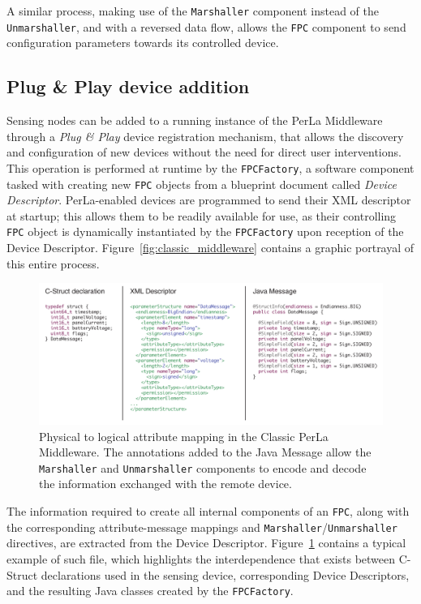 A similar process, making use of the \texttt{Marshaller} component instead of
the \texttt{Unmarshaller}, and with a reversed data flow, allows the
\texttt{FPC} component to send configuration parameters towards its controlled
device.

\subsection{Plug \& Play device addition}
\label{sec:classic_fpcfactory}

Sensing nodes can be added to a running instance of the PerLa Middleware
through a \textit{Plug \& Play} device registration mechanism, that allows the
discovery and configuration of new devices without the need for direct user
interventions. This operation is performed at runtime by the
\texttt{FPCFactory}, a software component tasked with creating new \texttt{FPC}
objects from a blueprint document called \textit{Device Descriptor}.
PerLa-enabled devices are programmed to send their XML descriptor at startup;
this allows them to be readily available for use, as their controlling
\texttt{FPC} object is dynamically instantiated by the \texttt{FPCFactory} upon
reception of the Device Descriptor. Figure~\ref{fig:classic_middleware}
contains a graphic portrayal of this entire process.

\begin{figure}[h!]
\includegraphics[width=\textwidth]{imgs/classic_descriptor.pdf}
\caption{Physical to logical attribute mapping in the Classic PerLa Middleware.
The annotations added to the Java Message allow the \texttt{Marshaller} and
\texttt{Unmarshaller} components to encode and decode the information exchanged 
with the remote device.}
\label{fig:classic_descriptor}
\end{figure}

The information required to create all internal components of an \texttt{FPC},
along with the corresponding attribute-message mappings and
\texttt{Marshaller}/\texttt{Unmarshaller} directives, are extracted from the
Device Descriptor. Figure~\ref{fig:classic_descriptor} contains a typical
example of such file, which highlights the interdependence that exists between
C-Struct declarations used in the sensing device, corresponding Device
Descriptors, and the resulting Java classes created by the \texttt{FPCFactory}.

